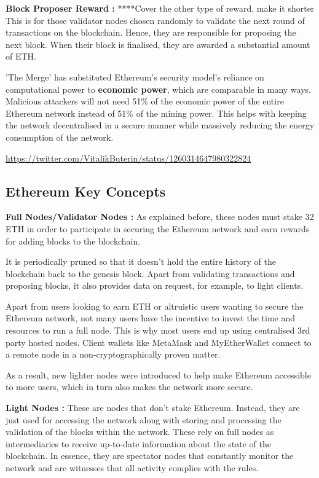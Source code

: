 \textbf{Block Proposer Reward :}
****Cover the other type of reward, make it shorter
This is for those validator nodes chosen randomly to validate the next round of transactions on the blockchain. Hence, they are responsible for proposing the next block. When their block is finalised, they are awarded a substantial amount of ETH.


'The Merge' has substituted Ethereum's security model's reliance on computational power to \textbf{economic power}, which are comparable in many ways. Malicious attackers will not need 51\% of the economic power of the entire Ethereum network instead of 51\% of the mining power. This helps with keeping the network decentralised in a secure manner while massively reducing the energy consumption of the network. 

\url{https://twitter.com/VitalikButerin/status/1260314647980322824}



\subsection{Ethereum Key Concepts}

\textbf{Full Nodes/Validator Nodes :}
As explained before, these nodes must stake 32 ETH in order to participate in securing the Ethereum network and earn rewards for adding blocks to the blockchain.

It is periodically pruned so that it doesn't hold the entire history of the blockchain back to the genesis block. Apart from validating transactions and proposing blocks, it also provides data on request, for example, to light clients.

Apart from users looking to earn ETH or altruistic users wanting to secure the Ethereum network, not many users have the incentive to invest the time and resources to run a full node. This is why most users end up using centralised 3rd party hosted nodes. Client wallets like MetaMask and MyEtherWallet connect to a remote node in a non-cryptographically proven matter. 

As a result, new lighter nodes were introduced to help make Ethereum accessible to more users, which in turn also makes the network more secure.

\textbf{Light Nodes :}
These are nodes that don't stake Ethereum. Instead, they are just used for accessing the network along with storing and processing the validation of the blocks within the network. These rely on full nodes as intermediaries to receive up-to-date information about the state of the blockchain. In essence, they are spectator nodes that constantly monitor the network and are witnesses that all activity complies with the rules.

